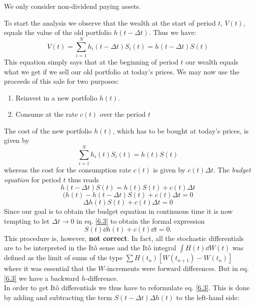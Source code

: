 \begin{remark}
    We only consider non-dividend paying assets.
\end{remark}
To start the analysis we observe that the wealth at the
start of period $t$, $V(t)$, equals the value of the old portfolio $h(t - \Delta t)$. Thus we have:
\begin{equation}\label{6.1}
    V(t) = \sum^N_{i=1}h_i(t-\Delta t)S_i(t) = h(t-\Delta t)S(t)
\end{equation}
This equation simply says that at the beginning of period $t$ our wealth equals what we get if we sell our old portfolio at today's
prices. We may now use the proceeds of this sale for two purposes:
\begin{enumerate}
    \item Reinvest in a new portfolio $h(t)$.
    \item Consume at the rate $c(t)$ over the period $t$
\end{enumerate}
The cost of the new portfolio $h(t)$, which has to be bought at today’s prices, is given by
\begin{equation}
    \sum^N_{i=1} h_i(t)S_i(t) = h(t)S(t)
\end{equation}
whereas the cost for the consumption rate $c(t)$ is given by $c(t)\Delta t$. The \emph{budget equation} for period $t$ thus reads
\begin{equation}
    h(t-\Delta t)S(t) = h(t)S(t) + c(t)\Delta t
\end{equation}
\begin{equation*}
    (h(t)-h(t-\Delta t)S(t) + c(t)\Delta t = 0
\end{equation*}
\begin{equation}\label{6.3}
    \Delta h(t)S(t) + c(t)\Delta t = 0
\end{equation}
Since our goal is to obtain the budget equation in continuous time it is now tempting to let $\Delta t \to 0$ in eq. \eqref{6.3} to obtain the formal expression
\begin{equation}
    S(t)\dd h(t) + c(t)\dd t = 0.
\end{equation}
This procedure is, however, \textbf{not correct}. In fact, all the stochastic differentials are to be interpreted in the Itô sense and the Itô integral $\int H(t)\dd W(t)$ was defined as the limit of sums of the type $\sum H(t_n)[W(t_{n+1})-W(t_n)]$ where it was essential that the $W$-increments were forward differences. But in eq. \eqref{6.3} we have a backward $h$-difference.\\
In order to get Itô differentials we thus have to reformulate eq. \eqref{6.3}. This is done by adding and subtracting the term $S(t- \Delta t)\Delta h(t)$ to the left-hand side:
